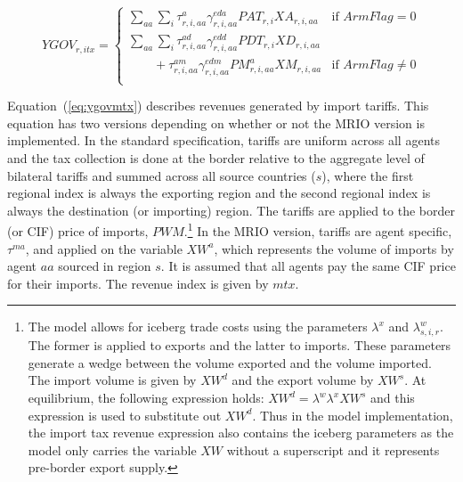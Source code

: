 \documentclass[11pt,letterpaper]{report}
\begin{document}
\begin{equation}
\label{eq:ygovitx}
\mathit{YGOV}_{r,itx} =
   \left\{
      \begin{array}{*{20}{l}}
         \displaystyle \sum_\mathit{aa} {\sum_i{
            \tau^a_{r,i,aa} \gamma^{\mathit{eda}}_{r,i,\mathit{aa}}
               \mathit{PAT}_{r,i} \mathit{XA}_{r,i,aa}
         }}
         & \textrm{if } \mathit{ArmFlag} = 0 \\
         \displaystyle \sum_\mathit{aa} {\sum_i{
            \tau^{\mathit{ad}}_{r,i,aa} \gamma^{\mathit{edd}}_{r,i,\mathit{aa}}
               \mathit{PDT}_{r,i} \mathit{XD}_{r,i,aa}
         }} \\
         \displaystyle \qquad + {{
            \tau^{\mathit{am}}_{r,i,aa} \gamma^{\mathit{edm}}_{r,i,\mathit{aa}}
               \mathit{PM}^a_{r,i,aa} \mathit{XM}_{r,i,aa}
         }}
         & \textrm{if } \mathit{ArmFlag} \ne 0 \\
      \end{array}
   \right.
\end{equation}

Equation~(\ref{eq:ygovmtx}) describes revenues generated by import tariffs. This
equation has two versions depending on whether or not the MRIO version is
implemented. In the standard specification, tariffs are uniform across all
agents and the tax collection is done at the border relative to the aggregate
level of bilateral tariffs and summed across all source countries ($s$), where
the first regional index is always the exporting region and the second regional
index is always the destination (or importing) region. The tariffs are applied
to the border (or CIF) price of imports, $\mathit{PWM}$.\footnote{The model
allows for iceberg trade costs using the parameters $\lambda^x$ and $\lambda^w_{s,i,r}$.
The former is applied to exports and the latter to imports.
These parameters generate a
wedge between the volume exported and the volume imported. The import volume is
given by $\mathit{XW}^d$ and the export volume by $\mathit{XW}^s$. At
equilibrium, the following expression holds: $\mathit{XW}^d = \lambda^w \lambda^x
\mathit{XW}^s$ and this expression is used to substitute out $\mathit{XW}^d$.
Thus in the model implementation, the import tax revenue expression also
contains the iceberg parameters as the model only carries the variable
$\mathit{XW}$ without a superscript and it represents pre-border export supply.} In the
MRIO version, tariffs are agent specific, $\tau^\mathit{ma}$, and applied on the
variable $\mathit{XW^a}$, which represents the volume of imports by agent
$\mathit{aa}$ sourced in region $s$. It is assumed that all agents pay the same
CIF price for their imports. The revenue index is given by $\mathit{mtx}$.
\end{document}
